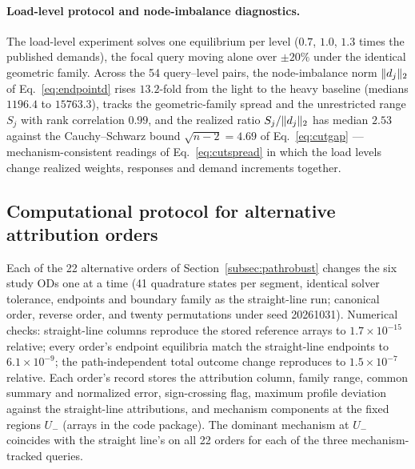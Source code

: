 \paragraph{Load-level protocol and node-imbalance diagnostics.}
The load-level experiment solves one equilibrium per level ($0.7$,
$1.0$, $1.3$ times the published demands), the focal query moving
alone over $\pm20\%$ under the identical geometric family. Across the
54 query--level pairs, the node-imbalance norm $\lVert d_j \rVert_2$ of
Eq.~\eqref{eq:endpointd} rises $13.2$-fold from the light to the
heavy baseline (medians $1196.4$ to $15763.3$), tracks the
geometric-family spread and the unrestricted range $S_j$ with rank
correlation $0.99$, and the realized ratio $S_j/\lVert d_j \rVert_2$ has
median $2.53$ against the Cauchy--Schwarz bound $\sqrt{n-2}=4.69$ of
Eq.~\eqref{eq:cutgap} --- mechanism-consistent readings of
Eq.~\eqref{eq:cutspread} in which the load levels change realized
weights, responses and demand increments together.

\subsection{Computational protocol for alternative attribution orders}\label{supp:pathrobust}
Each of the 22 alternative orders of Section~\ref{subsec:pathrobust}
changes the six study ODs one at a time (41 quadrature states per
segment, identical solver tolerance, endpoints and boundary family as
the straight-line run; canonical order, reverse order, and twenty
permutations under seed 20261031). Numerical checks: straight-line columns
reproduce the stored reference arrays to $1.7\times10^{-15}$ relative; every
order's endpoint equilibria match the straight-line endpoints to
$6.1\times10^{-9}$; the path-independent total outcome change
reproduces to $1.5\times10^{-7}$ relative. Each order's record stores
the attribution column, family range, common summary and normalized
error, sign-crossing flag, maximum profile deviation against the
straight-line attributions, and mechanism components at the fixed regions
$U_-$ (arrays in the code package). The dominant mechanism at $U_-$
coincides with the straight line's on all 22 orders for each of the
three mechanism-tracked queries.

